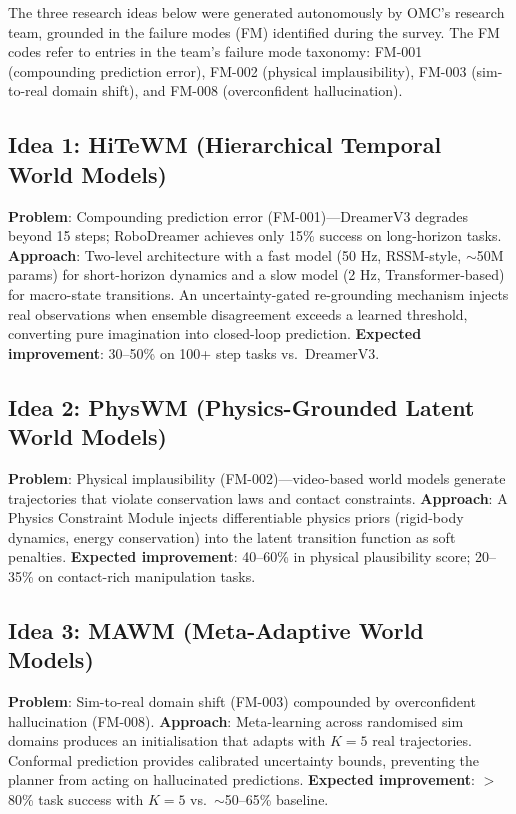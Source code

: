 The three research ideas below were generated autonomously by OMC's research team, grounded in the failure modes (FM) identified during the survey.  The FM codes refer to entries in the team's failure mode taxonomy: FM-001 (compounding prediction error), FM-002 (physical implausibility), FM-003 (sim-to-real domain shift), and FM-008 (overconfident hallucination).

\subsection*{Idea 1: HiTeWM (Hierarchical Temporal World Models)}
\textbf{Problem}: Compounding prediction error (FM-001)---DreamerV3 degrades beyond 15 steps; RoboDreamer achieves only 15\% success on long-horizon tasks.  \textbf{Approach}: Two-level architecture with a fast model (50 Hz, RSSM-style, $\sim$50M params) for short-horizon dynamics and a slow model (2 Hz, Transformer-based) for macro-state transitions.  An uncertainty-gated re-grounding mechanism injects real observations when ensemble disagreement exceeds a learned threshold, converting pure imagination into closed-loop prediction.  \textbf{Expected improvement}: 30--50\% on 100+ step tasks vs.\ DreamerV3.

\subsection*{Idea 2: PhysWM (Physics-Grounded Latent World Models)}
\textbf{Problem}: Physical implausibility (FM-002)---video-based world models generate trajectories that violate conservation laws and contact constraints.  \textbf{Approach}: A Physics Constraint Module injects differentiable physics priors (rigid-body dynamics, energy conservation) into the latent transition function as soft penalties.  \textbf{Expected improvement}: 40--60\% in physical plausibility score; 20--35\% on contact-rich manipulation tasks.

\subsection*{Idea 3: MAWM (Meta-Adaptive World Models)}
\textbf{Problem}: Sim-to-real domain shift (FM-003) compounded by overconfident hallucination (FM-008).  \textbf{Approach}: Meta-learning across randomised sim domains produces an initialisation that adapts with $K{=}5$ real trajectories.  Conformal prediction provides calibrated uncertainty bounds, preventing the planner from acting on hallucinated predictions.  \textbf{Expected improvement}: $>$80\% task success with $K{=}5$ vs.\ $\sim$50--65\% baseline.

